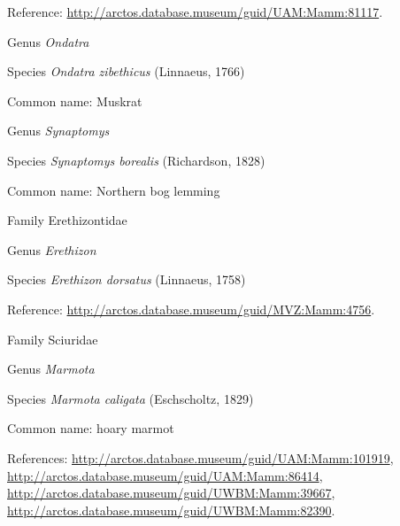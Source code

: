 \documentclass[9pt, article]{memoir}
\begin{document}
\begin{multicols}{2}
Reference: 
\url{http://arctos.database.museum/guid/UAM:Mamm:81117}.

\vspace{6pt}\noindent\hspace{30pt}Genus \textit{Ondatra}


\vspace{6pt}\noindent\hspace{36pt}Species \textit{Ondatra zibethicus} (Linnaeus, 1766)


Common name: Muskrat

\vspace{6pt}\noindent\hspace{30pt}Genus \textit{Synaptomys}


\vspace{6pt}\noindent\hspace{36pt}Species \textit{Synaptomys borealis} (Richardson, 1828)


Common name: Northern bog lemming

\vspace{6pt}\noindent\hspace{24pt}Family Erethizontidae


\vspace{6pt}\noindent\hspace{30pt}Genus \textit{Erethizon}


\vspace{6pt}\noindent\hspace{36pt}Species \textit{Erethizon dorsatus} (Linnaeus, 1758)


Reference: 
\url{http://arctos.database.museum/guid/MVZ:Mamm:4756}.

\vspace{6pt}\noindent\hspace{24pt}Family Sciuridae


\vspace{6pt}\noindent\hspace{30pt}Genus \textit{Marmota}


\vspace{6pt}\noindent\hspace{36pt}Species \textit{Marmota caligata} (Eschscholtz, 1829)


Common name: hoary marmot

References: 
\url{http://arctos.database.museum/guid/UAM:Mamm:101919}, 
\url{http://arctos.database.museum/guid/UAM:Mamm:86414}, 
\url{http://arctos.database.museum/guid/UWBM:Mamm:39667}, 
\url{http://arctos.database.museum/guid/UWBM:Mamm:82390}.


\end{multicols}
\end{document}
